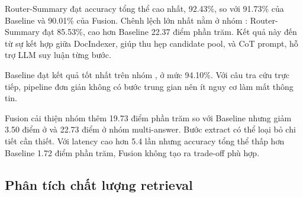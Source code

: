 \documentclass[../DoAn.tex]{subfiles}
\begin{document}
\begin{table}[H]
    \centering
    \caption{Accuracy tổng thể và theo intent của ba pipeline v1}
    \label{tab:v1-accuracy}
    {\small
    \setlength{\tabcolsep}{3pt}
    }
\end{table}

Router-Summary đạt accuracy tổng thể cao nhất, 92.43\%, so với 91.73\% của Baseline và 90.01\% của Fusion. Chênh lệch lớn nhất nằm ở nhóm : Router-Summary đạt 85.53\%, cao hơn Baseline 22.37 điểm phần trăm. Kết quả này đến từ sự kết hợp giữa DocIndexer, giúp thu hẹp candidate pool, và CoT prompt, hỗ trợ LLM suy luận từng bước.

Baseline đạt kết quả tốt nhất trên nhóm , ở mức 94.10\%. Với câu tra cứu trực tiếp, pipeline đơn giản không có bước trung gian nên ít nguy cơ làm mất thông tin.

Fusion cải thiện nhóm  thêm 19.73 điểm phần trăm so với Baseline nhưng giảm 3.50 điểm ở  và 22.73 điểm ở nhóm multi-answer. Bước extract có thể loại bỏ chi tiết cần thiết. Với latency cao hơn 5.4 lần nhưng accuracy tổng thể thấp hơn Baseline 1.72 điểm phần trăm, Fusion không tạo ra trade-off phù hợp.

\subsection{Phân tích chất lượng retrieval}
\label{subsection:3.4.3}
\end{document}

